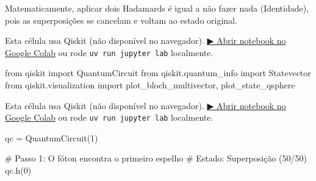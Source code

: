\documentclass[
  brazilian,
]{report}
\newenvironment{Shaded}{\begin{snugshade}}{\end{snugshade}}
\newcommand{\CommentTok}[1]{\textcolor[rgb]{0.37,0.37,0.37}{#1}}
\newcommand{\DecValTok}[1]{\textcolor[rgb]{0.68,0.00,0.00}{#1}}
\newcommand{\ImportTok}[1]{\textcolor[rgb]{0.00,0.46,0.62}{#1}}
\newcommand{\NormalTok}[1]{\textcolor[rgb]{0.00,0.23,0.31}{#1}}
\newcommand{\OperatorTok}[1]{\textcolor[rgb]{0.37,0.37,0.37}{#1}}
\begin{document}
Matematicamente, aplicar dois Hadamards é igual a não fazer nada
(Identidade), pois as superposições se cancelam e voltam ao estado
original.

\begin{tcolorbox}[enhanced jigsaw, arc=.35mm, bottomrule=.15mm, bottomtitle=1mm, breakable, colback=white, colbacktitle=quarto-callout-warning-color!10!white, colframe=quarto-callout-warning-color-frame, coltitle=black, left=2mm, leftrule=.75mm, opacityback=0, opacitybacktitle=0.6, rightrule=.15mm, title=\textcolor{quarto-callout-warning-color}{\faExclamationTriangle}\hspace{0.5em}{⚛️ Célula Qiskit --- execute no Colab ou localmente}, titlerule=0mm, toprule=.15mm, toptitle=1mm]

Esta célula usa Qiskit (não disponível no navegador).
\href{https://colab.research.google.com/github/maxwellamaral/aula-quantum/blob/main/notebooks/04-Hadamard-experiment.ipynb}{▶
Abrir notebook no Google Colab} ou rode \texttt{uv\ run\ jupyter\ lab}
localmente.

\begin{Shaded}
\begin{Highlighting}[]

\ImportTok{from}\NormalTok{ qiskit }\ImportTok{import}\NormalTok{ QuantumCircuit}
\ImportTok{from}\NormalTok{ qiskit.quantum\_info }\ImportTok{import}\NormalTok{ Statevector}
\ImportTok{from}\NormalTok{ qiskit.visualization }\ImportTok{import}\NormalTok{ plot\_bloch\_multivector, plot\_state\_qsphere}
\end{Highlighting}
\end{Shaded}

\end{tcolorbox}

\begin{tcolorbox}[enhanced jigsaw, arc=.35mm, bottomrule=.15mm, bottomtitle=1mm, breakable, colback=white, colbacktitle=quarto-callout-warning-color!10!white, colframe=quarto-callout-warning-color-frame, coltitle=black, left=2mm, leftrule=.75mm, opacityback=0, opacitybacktitle=0.6, rightrule=.15mm, title=\textcolor{quarto-callout-warning-color}{\faExclamationTriangle}\hspace{0.5em}{⚛️ Célula Qiskit --- execute no Colab ou localmente}, titlerule=0mm, toprule=.15mm, toptitle=1mm]

Esta célula usa Qiskit (não disponível no navegador).
\href{https://colab.research.google.com/github/maxwellamaral/aula-quantum/blob/main/notebooks/04-Hadamard-experiment.ipynb}{▶
Abrir notebook no Google Colab} ou rode \texttt{uv\ run\ jupyter\ lab}
localmente.

\begin{Shaded}
\begin{Highlighting}[]


\NormalTok{qc }\OperatorTok{=}\NormalTok{ QuantumCircuit(}\DecValTok{1}\NormalTok{)}

\CommentTok{\# Passo 1: O fóton encontra o primeiro espelho}
\CommentTok{\# Estado: Superposição (50/50)}
\NormalTok{qc.h(}\DecValTok{0}\NormalTok{) }
\end{Highlighting}
\end{Shaded}

\end{tcolorbox}
\end{document}
